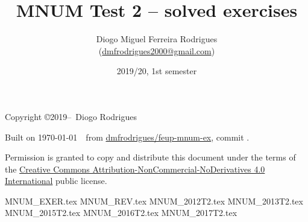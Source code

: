 \documentclass{mnum}
\title{MNUM Test 2 -- solved exercises}
\author{Diogo Miguel Ferreira Rodrigues \\ (\href{mailto:dmfrodrigues2000@gmail.com}{dmfrodrigues2000@gmail.com})}
\date{2019/20, 1st semester}
\begin{document}
\maketitle
\begin{secondpage}
    Copyright \copyright 2019--\the\year\ Diogo Rodrigues\par
    \par
    \immediate{}
    Built on \today~\currenttime~from \href{https://github.com/dmfrodrigues/feup-mnum-ex}{dmfrodrigues/feup-mnum-ex}, commit \unskip.\par
    Permission is granted to copy and distribute this document under the terms of the
    \href{https://creativecommons.org/licenses/by-nc-nd/4.0/}{Creative Commons Attribution-NonCommercial-NoDerivatives 4.0 International}
    public license.
\end{secondpage}
\frontmatter
\tableofcontents
\mainmatter
{MNUM_EXER.tex}
{MNUM_REV.tex}
{MNUM_2012T2.tex}
{MNUM_2013T2.tex}
{MNUM_2015T2.tex}
{MNUM_2016T2.tex}
{MNUM_2017T2.tex}
\end{document}
